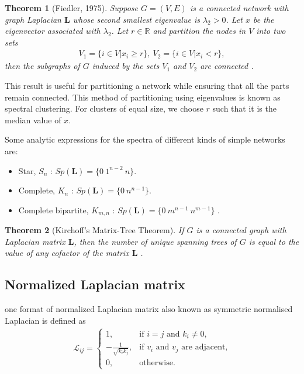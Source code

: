 \documentclass[10pt,a4paper]{article}
\newtheorem{thm}{Theorem}
\begin{document}
\begin{thm}[Fiedler, 1975]
	Suppose $G = (V,E)$ is a connected network with graph Laplacian $\mathbf{L}$ whose second smallest eigenvalue is $\lambda_2 > 0$. Let $x$ be the eigenvector associated with $\lambda_2$. Let $r \in \mathbb{R}$ and partition the nodes in $V$ into two sets
	\begin{eqnarray}
	V_1 = \{i \in V|x_i \geq r\}, ~ V_2 = \{i \in V | x_i < r\}, 
	\end{eqnarray}
	then the subgraphs of $G$ induced by the sets $V_1$ and $V_2$ are connected \citep{estrada2015first}.
	\label{fiedler}
\end{thm}
This result is useful for partitioning a network while ensuring that all the parts remain connected. This method of partitioning using eigenvalues is known as spectral clustering. For clusters of equal size, we choose $r$ such that it is the median value of $x$. 


Some analytic expressions for the spectra of different kinds of simple networks are:
\begin{itemize}
	\item Star, $S_n$ : $Sp(\mathbf{L}) = \{ 0~ 1^{n-2}~n\}$. 
	
	\item Complete, $K_n$ : $Sp(\mathbf{L}) = \{ 0~ n^{n-1} \}$. 
	
	\item Complete bipartite, $K_{m,n}$ : $Sp(\mathbf{L}) =\{ 0 ~ m^{n-1} ~ n^{m-1}\}$ \citep{estrada2011structure}.
	
\end{itemize}

\begin{thm}[Kirchoff's Matrix-Tree Theorem]
	If $G$ is a connected graph with Laplacian matrix $\mathbf{L}$, then the number of unique spanning trees of $G$ is equal to the value of any cofactor of the matrix $\mathbf{L}$ \citep{harris2008combinatorics}.
	\label{thm:kirchoff}
\end{thm}

\subsection{Normalized Laplacian matrix}
one format of normalized Laplacian matrix also known as symmetric normalised Laplacian is defined as 
\begin{eqnarray*}
	\mathcal{L}_{ij} = \begin{cases} 1, &\mbox{if } i = j \text{ and } k_i \neq  0, \\
		- \frac{1}{\sqrt{k_i k_j}}, &\mbox{if } v_i \text{ and } v_j \text{ are adjacent,} \\ 
		0, & \text{otherwise}.
	\end{cases}
\end{eqnarray*}
\end{document}
